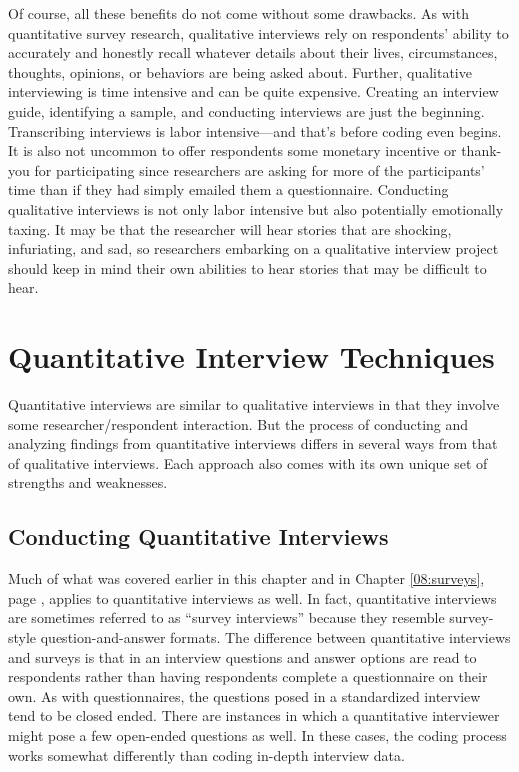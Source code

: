 Of course, all these benefits do not come without some drawbacks. As with quantitative survey research, qualitative interviews rely on respondents' ability to accurately and honestly recall whatever details about their lives, circumstances, thoughts, opinions, or behaviors are being asked about. Further, qualitative interviewing is time intensive and can be quite expensive. Creating an interview guide, identifying a sample, and conducting interviews are just the beginning. Transcribing interviews is labor intensive---and that's before coding even begins. It is also not uncommon to offer respondents some monetary incentive or thank-you for participating since researchers are asking for more of the participants' time than if they had simply emailed them a questionnaire. Conducting qualitative interviews is not only labor intensive but also potentially emotionally taxing. It may be that the researcher will hear stories that are shocking, infuriating, and sad, so researchers embarking on a qualitative interview project should keep in mind their own abilities to hear stories that may be difficult to hear.

\section{Quantitative Interview Techniques}

Quantitative interviews are similar to qualitative interviews in that they involve some researcher/respondent interaction. But the process of conducting and analyzing findings from quantitative interviews differs in several ways from that of qualitative interviews. Each approach also comes with its own unique set of strengths and weaknesses.

\subsection{Conducting Quantitative Interviews}

Much of what was covered earlier in this chapter and in Chapter \ref{08:surveys}, page \pageref{08:surveys}, applies to quantitative interviews as well. In fact, quantitative interviews are sometimes referred to as ``survey interviews'' because they resemble survey-style question-and-answer formats. The difference between quantitative interviews and surveys is that in an interview questions and answer options are read to respondents rather than having respondents complete a questionnaire on their own. As with questionnaires, the questions posed in a standardized interview tend to be closed ended. There are instances in which a quantitative interviewer might pose a few open-ended questions as well. In these cases, the coding process works somewhat differently than coding in-depth interview data.

